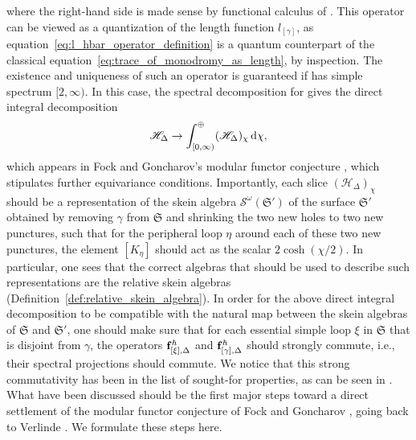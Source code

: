 \documentclass[pdftex]{sigma}
\numberwithin{equation}{section}
\theoremstyle{definition}
\begin{document}
where the right-hand side is made sense by functional calculus of . This operator  can be viewed as a quantization of the length function $l_{[\gamma]}$, as equation~\eqref{eq:l_hbar_operator_definition} is a quantum counterpart of the classical equation~\eqref{eq:trace_of_monodromy_as_length}, by inspection.
The existence and uniqueness of such an operator  is guaranteed if  has simple spectrum $[2,\infty)$. In this case, the spectral decomposition for  gives the direct integral decomposition
\begin{align}
\label{eq:direct_integral_decomposition}
\mathscr{H}_\Delta \to \int^\oplus_{[0,\infty)} (\mathscr{H}_\Delta)_\chi \, {\rm d}\chi,
\end{align}
which appears in Fock and Goncharov's modular functor conjecture \cite{F97, FG09}, which stipulates further equivariance conditions. Importantly, each slice $(\mathscr{H}_\Delta)_\chi$ should be a representation of the skein algebra $\mathcal{S}^\omega(\mathfrak{S}')$ of the surface $\mathfrak{S}'$ obtained by removing $\gamma$ from $\mathfrak{S}$ and shrinking the two new holes to two new punctures, such that for the peripheral loop $\eta$ around each of these two new punctures, the element $[K_\eta]$ should act as the scalar $2\cosh(\chi/2)$. In particular, one sees that the correct algebras that should be used to describe such representations are the relative skein algebras (Definition~\ref{def:relative_skein_algebra}). In order for the above direct integral decomposition to be compatible with the natural map between the skein algebras of $\mathfrak{S}$ and $\mathfrak{S}'$, one should make sure that for each essential simple loop $\xi$ in $\mathfrak{S}$ that is disjoint from $\gamma$, the operators ${\bf f}^\hbar_{[\xi],\Delta}$ and ${\bf f}^\hbar_{[\gamma],\Delta}$ should strongly commute, i.e., their spectral projections should commute. We notice that this strong commutativity has been in the list of sought-for properties, as can be seen in \cite[p.~160, item~6]{CF2} \cite[p.~26, item~3]{F97} \cite[Section~15.1, item~(b)]{T}.
What have been discussed should be the first major steps toward a direct settlement of the modular functor conjecture of Fock and Goncharov \cite{F97, FG09}, going back to Verlinde \cite{Verlinde}. We formulate these steps here.
\end{document}
